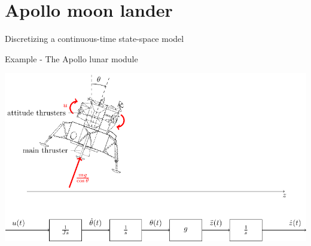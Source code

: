 \documentclass[presentation,aspectratio=1610]{beamer}
\begin{document}
\section{Apollo moon lander}
\label{sec:org5cca4ce}
\begin{frame}[label={sec:org9930f8c}]{Discretizing a continuous-time state-space model}
\end{frame}

\begin{frame}[label={sec:orgd570eaa}]{Example - The Apollo lunar module}
\begin{center}
\includegraphics[width=\linewidth]{../../figures/fig-apollo}
\end{center}
\end{frame}
\end{document}

